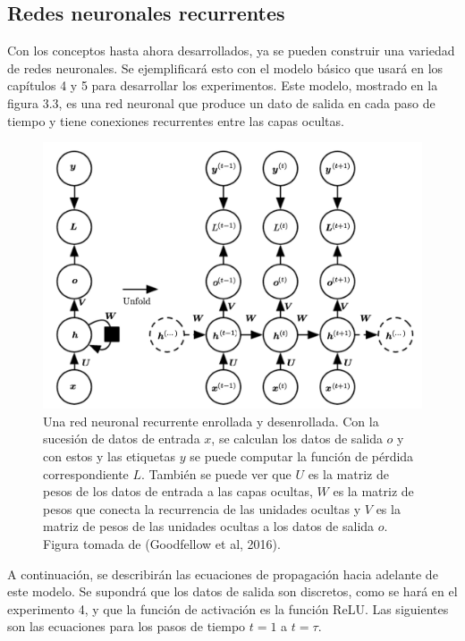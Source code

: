 \subsection{Redes neuronales recurrentes}
Con los conceptos hasta ahora desarrollados, ya se pueden construir una variedad de redes neuronales. Se ejemplificará esto con el modelo básico que usará en los capítulos 4 y 5 para desarrollar los experimentos. Este modelo, mostrado en la figura 3.3, es una red neuronal que produce un dato de salida en cada paso de tiempo y tiene conexiones recurrentes entre las capas ocultas.
\cite{goodfellow-et-al-2016}
\cite{DBLP:journals/corr/Graves13}

\begin{figure}[h]
\begin{center}
\includegraphics[width=150mm, scale = 0.8]{./imag/unfold3.png}
\end{center}
\caption{Una red neuronal recurrente enrollada y desenrollada. Con la sucesión de datos de entrada $x$, se calculan los datos de salida $o$ y con estos y las etiquetas $y$ se puede computar la función de pérdida correspondiente $L$. También se puede ver que $U$ es la matriz de pesos de los datos de entrada a las capas ocultas, $W$ es la matriz de pesos que conecta la recurrencia de las unidades ocultas y $V$ es la matriz de pesos de las unidades ocultas a los datos de salida $o$. Figura tomada de (Goodfellow et al, 2016).}
\end{figure}

\vspace{1em}

A continuación, se describirán las ecuaciones de propagación hacia adelante de este modelo. Se supondrá que los datos de salida son discretos, como se hará en el experimento 4, y que la función de activación es la función ReLU. Las siguientes son las ecuaciones para los pasos de tiempo $t=1$ a $t=\tau$.

